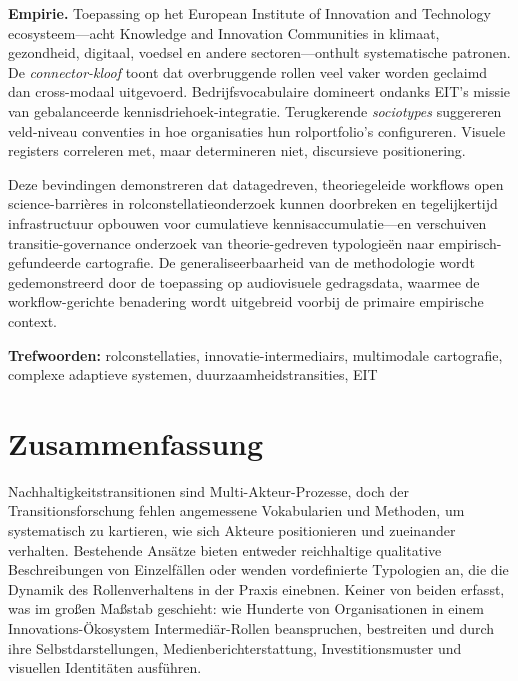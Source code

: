 \documentclass[../main.tex]{subfiles}
\begin{document}
\textbf{Empirie.} Toepassing op het European Institute of Innovation and Technology ecosysteem---acht Knowledge and Innovation Communities in klimaat, gezondheid, digitaal, voedsel en andere sectoren---onthult systematische patronen. De \textit{connector-kloof} toont dat overbruggende rollen veel vaker worden geclaimd dan cross-modaal uitgevoerd. Bedrijfsvocabulaire domineert ondanks EIT's missie van gebalanceerde kennisdriehoek-integratie. Terugkerende \textit{sociotypes} suggereren veld-niveau conventies in hoe organisaties hun rolportfolio's configureren. Visuele registers correleren met, maar determineren niet, discursieve positionering.

Deze bevindingen demonstreren dat datagedreven, theoriegeleide workflows open science-barrières in rolconstellatieonderzoek kunnen doorbreken en tegelijkertijd infrastructuur opbouwen voor cumulatieve kennisaccumulatie---en verschuiven transitie-governance onderzoek van theorie-gedreven typologieën naar empirisch-gefundeerde cartografie. De generaliseerbaarheid van de methodologie wordt gedemonstreerd door de toepassing op audiovisuele gedragsdata, waarmee de workflow-gerichte benadering wordt uitgebreid voorbij de primaire empirische context.

\textbf{Trefwoorden:} rolconstellaties, innovatie-intermediairs, multimodale cartografie, complexe adaptieve systemen, duurzaamheidstransities, EIT

\vspace{1.5cm}

\chapter*{Zusammenfassung}

Nachhaltigkeitstransitionen sind Multi-Akteur-Prozesse, doch der Transitionsforschung fehlen angemessene Vokabularien und Methoden, um systematisch zu kartieren, wie sich Akteure positionieren und zueinander verhalten. Bestehende Ansätze bieten entweder reichhaltige qualitative Beschreibungen von Einzelfällen oder wenden vordefinierte Typologien an, die die Dynamik des Rollenverhaltens in der Praxis einebnen. Keiner von beiden erfasst, was im großen Maßstab geschieht: wie Hunderte von Organisationen in einem Innovations-Ökosystem Intermediär-Rollen beanspruchen, bestreiten und durch ihre Selbstdarstellungen, Medienberichterstattung, Investitionsmuster und visuellen Identitäten ausführen.
\end{document}
